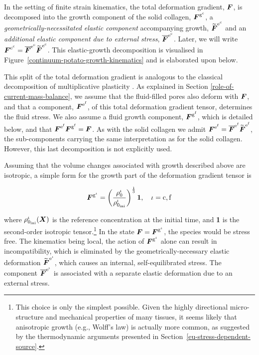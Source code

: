 In the setting of finite strain kinematics, the total deformation
gradient, $\mbox{\boldmath$ F$}$, is decomposed into the growth component of the solid
collagen, $\mbox{\boldmath$ F$}^{\mathrm{g}^\mathrm{c}}$, a
\emph{geometrically-necessitated elastic component} accompanying
growth, $\widetilde{\mbox{\boldmath$ F$}}^{\mathrm{e}^\mathrm{c}}$ and an
\emph{additional elastic component due to external stress},
$\overline{\mbox{\boldmath$ F$}}^{\mathrm{e}^\mathrm{c}}$. Later, we will write
$\mbox{\boldmath$ F$}^{\mathrm{e}^\mathrm{c}} = \overline{\mbox{\boldmath$ F$}}^{\mathrm{e}^\mathrm{c}}
\widetilde{\mbox{\boldmath$ F$}}^{\mathrm{e}^\mathrm{c}}$. This elastic-growth
decomposition is visualised in
Figure~\ref{continuum-potato-growth-kinematics} and is elaborated upon
below.

This split of the total deformation gradient is analogous to the
classical decomposition of multiplicative plasticity
\citep{Bilbyetal:1956,Lee:1969}. As explained in Section
\ref{role-of-current-mass-balance}, we assume that the fluid-filled
pores also deform with $\mbox{\boldmath$ F$}$, and that a component,
$\mbox{\boldmath$ F$}^{\mathrm{e}^\mathrm{f}}$, of this total deformation gradient
tensor, determines the fluid stress. We also assume a fluid growth
component, $\mbox{\boldmath$ F$}^{\mathrm{g}^\mathrm{f}}$, which is detailed below, and
that $\mbox{\boldmath$ F$}^{\mathrm{e}^\mathrm{f}}\mbox{\boldmath$ F$}^{\mathrm{g}^\mathrm{f}} =
\mbox{\boldmath$ F$}$. As with the solid collagen we admit $\mbox{\boldmath$ F$}^{\mathrm{e}^\mathrm{f}}
= \overline{\mbox{\boldmath$ F$}}^{\mathrm{e}^\mathrm{f}}
\widetilde{\mbox{\boldmath$ F$}}^{\mathrm{e}^\mathrm{f}}$, the sub-components carrying
the same interpretation as for the solid collagen. However, this last
decomposition is not explicitly used.

Assuming that the volume changes associated with growth described
above are isotropic, a simple form for the growth part of the
deformation gradient tensor is

\begin{equation}
\mbox{\boldmath$ F$}^{\mathrm{g}^\iota} = \left(
\frac{\rho_0^\iota}{\rho_{0_{\mathrm{ini}}}^\iota} \right)^
     {\frac{1}{3}} {\bf 1},\quad \iota = \mathrm{c,f}
\label{isotropicgrowth} 
\end{equation} 

\noindent where $\rho_{0_{\mathrm{ini}}}^\iota(\mbox{\boldmath$ X$})$ is the reference
concentration at the initial time, and {\bf 1} is the second-order
isotropic tensor.\footnote{This choice is only the simplest
  possible. Given the highly directional micro-structure and
  mechanical properties of many tissues, it seems likely that
  anisotropic growth (e.g., Wolff's law) is actually more common, as
  suggested by the thermodynamic arguments presented in
  Section~\ref{eu-stress-dependent-source}.} In the state $\mbox{\boldmath$ F$} =
\mbox{\boldmath$ F$}^{\mathrm{g}^\iota}$, the species would be stress free. The
kinematics being local, the action of $\mbox{\boldmath$ F$}^{\mathrm{g}^\iota}$ alone
can result in incompatibility, which is eliminated by the
geometrically-necessary elastic deformation
$\widetilde{\mbox{\boldmath$ F$}}^{\mathrm{e}^{\mathrm{\iota}}}$, which causes an
internal, self-equilibrated stress. The component
$\overline{\mbox{\boldmath$ F$}}^{\mathrm{e}^\iota}$ is associated with a separate
elastic deformation due to an external stress.

